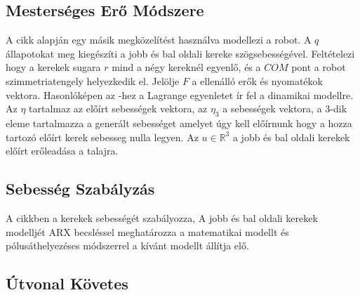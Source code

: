 \subsection{Mesterséges Erő Módszere}
A \cite{SSMRartificialForceMethod} cikk alapján egy másik megközelítést használva modellezi a robot. A $q$ állapotokat meg kiegészíti a jobb és bal oldali kereke szögsebességével. Feltételezi hogy a kerekek sugara $r$ mind a négy kereknél egyenlő, és a $COM$ pont a robot szimmetriatengely helyezkedik el. Jelölje $F$ a ellenálló erők és nyomatékok vektora. Hasonlóképen az   -hez a Lagrange egyenletet ír fel a dinamikai modellre. Az $\eta$ tartalmaz az előírt sebességek vektora, az $\eta_{3}$ a sebességek vektora, a 3-dik eleme tartalmazza a generált sebességet amelyet úgy kell előírnunk hogy a hozza tartozó előírt kerek sebesseg nulla legyen.
Az $u \in \mathbb{R}^3$ a jobb és bal oldali kerekek előírt erőleadása a talajra.







\subsection{Sebesség Szabályzás}
A \cite{Campa2014} cikkben a kerekek sebességét szabályozza, A jobb és bal oldali kerekek modelljét ARX becsléssel meghatározza a matematikai modellt és pólusáthelyezéses  módszerrel a kívánt modellt állítja elő. 



\subsection{Útvonal Követes}

% 

